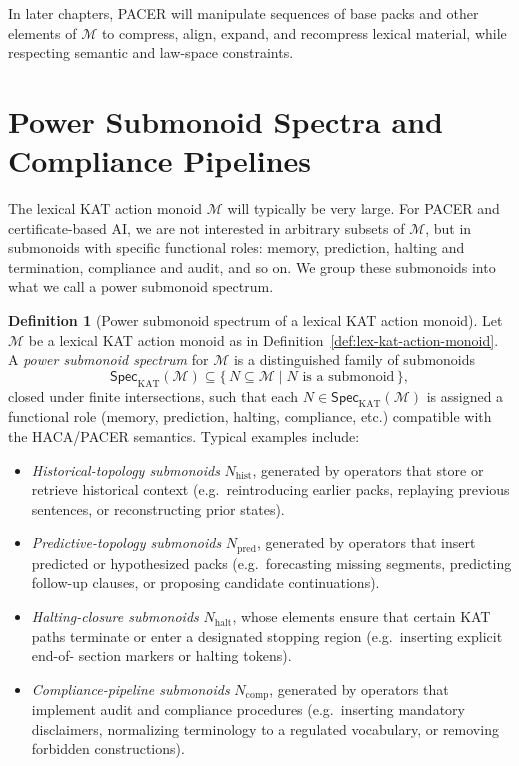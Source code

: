 \documentclass[11pt]{book}
\theoremstyle{plain}
\theoremstyle{definition}
\newtheorem{definition}[theorem]{Definition}
\theoremstyle{remark}
\begin{document}
In later chapters, PACER will manipulate sequences of base packs and
other elements of $\mathcal{M}$ to compress, align, expand, and
recompress lexical material, while respecting semantic and law-space
constraints.

\section[Power Submonoid Spectra and Compliance Pipelines]{Power Submonoid Spectra and Compliance Pipelines}


The lexical KAT action monoid $\mathcal{M}$ will typically be very
large. For PACER and certificate-based AI, we are not interested in
arbitrary subsets of $\mathcal{M}$, but in submonoids with specific
functional roles: memory, prediction, halting and termination,
compliance and audit, and so on. We group these submonoids into what
we call a power submonoid spectrum.

\begin{definition}[Power submonoid spectrum of a lexical KAT action monoid]
\label{def:power-submonoid-spectrum}
Let $\mathcal{M}$ be a lexical KAT action monoid as in
Definition~\ref{def:lex-kat-action-monoid}. A \emph{power submonoid
spectrum} for $\mathcal{M}$ is a distinguished family of submonoids
\[
  \mathsf{Spec}_{\mathrm{KAT}}(\mathcal{M})
  \subseteq
  \{\, N\subseteq\mathcal{M} \mid N\text{ is a submonoid} \,\},
\]
closed under finite intersections, such that each $N\in
\mathsf{Spec}_{\mathrm{KAT}}(\mathcal{M})$ is assigned a functional
role (memory, prediction, halting, compliance, etc.) compatible with
the HACA/PACER semantics. Typical examples include:
\begin{itemize}
  \item \emph{Historical-topology submonoids} $N_{\mathrm{hist}}$,
        generated by operators that store or retrieve historical
        context (e.g.\ reintroducing earlier packs, replaying previous
        sentences, or reconstructing prior states).
  \item \emph{Predictive-topology submonoids} $N_{\mathrm{pred}}$,
        generated by operators that insert predicted or hypothesized
        packs (e.g.\ forecasting missing segments, predicting
        follow-up clauses, or proposing candidate continuations).
  \item \emph{Halting-closure submonoids} $N_{\mathrm{halt}}$, whose
        elements ensure that certain KAT paths terminate or enter a
        designated stopping region (e.g.\ inserting explicit end-of-
        section markers or halting tokens).
  \item \emph{Compliance-pipeline submonoids} $N_{\mathrm{comp}}$,
        generated by operators that implement audit and compliance
        procedures (e.g.\ inserting mandatory disclaimers, normalizing
        terminology to a regulated vocabulary, or removing forbidden
        constructions).
\end{itemize}
\end{definition}
\end{document}
